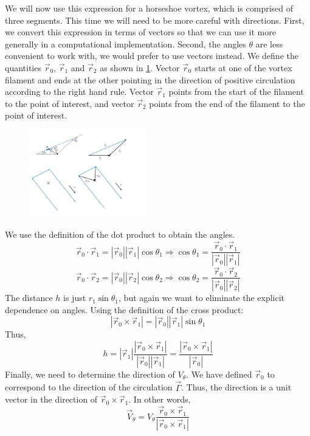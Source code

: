 \documentclass{article}
\begin{document}
We will now use this expression for a horseshoe vortex, which is comprised of three segments.  This time we will need to be more careful with directions.  First, we convert this expression in terms of vectors so that we can use it more generally in a computational implementation.  Second, the angles $\theta$ are less convenient to work with, we would prefer to use vectors instead.  We define the quantities $\vec{r}_0$, $\vec{r}_1$ and $\vec{r}_2$ as shown in \cref{fig:vectordef}.  Vector $\vec{r}_0$ starts at one of the vortex filament and ends at the other pointing in the direction of positive circulation according to the right hand rule.  Vector $\vec{r}_1$ points from the start of the filament to the point of interest, and vector $\vec{r}_2$ points from the end of the filament to the point of interest.

\begin{figure}[htbp]
\centering
\includegraphics[width=2in]{figs/vectordef}
\caption{}
\label{fig:vectordef}
\end{figure}

We use the definition of the dot product to obtain the angles.
\begin{equation}
\vec{r}_0 \cdot \vec{r}_1 = |\vec{r}_0||\vec{r}_1| \cos\theta_1 \Rightarrow \cos\theta_1 = \frac{\vec{r}_0 \cdot \vec{r}_1}{|\vec{r}_0||\vec{r}_1|}
\end{equation}
\begin{equation}
\vec{r}_0 \cdot \vec{r}_2 = |\vec{r}_0||\vec{r}_2|  \cos\theta_2
\Rightarrow \cos\theta_2 = \frac{\vec{r}_0 \cdot \vec{r}_2}{|\vec{r}_0||\vec{r}_2|}
\end{equation}
The distance $h$ is just $r_1 \sin\theta_1$, but again we want to eliminate the explicit dependence on angles.  Using the definition of the cross product:
\begin{equation}
|\vec{r}_0 \times \vec{r}_1 | = |\vec{r}_0| |\vec{r}_1| \sin\theta_1 
\end{equation}
Thus,
\begin{equation}
h = |\vec{r}_1| \frac{|\vec{r}_0 \times \vec{r}_1 |}{|\vec{r}_0| |\vec{r}_1|} = \frac{|\vec{r}_0 \times \vec{r}_1 |}{|\vec{r}_0|}
\end{equation}
Finally, we need to determine the direction of $V_\theta$.  We have defined $\vec{r}_0$ to correspond to the direction of the circulation $\vec\Gamma$.  Thus, the direction is a unit vector in the direction of $\vec{r}_0 \times \vec{r}_1$.  In other words, 
\begin{equation}
\vec{V}_\theta = V_\theta \frac{\vec{r}_0 \times \vec{r}_1}{|\vec{r}_0 \times \vec{r}_1|}
\end{equation}
\end{document}
